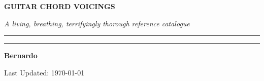\documentclass[../main.tex]{subfiles}
\begin{document}
\begin{titlepage}
    \centering
    \vspace*{2.5cm}

    {\Huge \bfseries GUITAR CHORD VOICINGS \par}
    \vspace{0.5cm}
    {\Large \itshape A living, breathing, terrifyingly thorough reference catalogue \par}
    
    \vspace{1.2cm}
    \rule{0.35\textwidth}{0.6pt}\par

    \vfill

    \par

    \vfill

    \rule{0.25\textwidth}{0.4pt}\par
    \vspace{0.8cm}

    {\Large \bfseries Bernardo \par}
    \vspace{0.3cm}
    {\large Last Updated: \today \par}

    \vspace*{2cm}
\end{titlepage}
\end{document}
